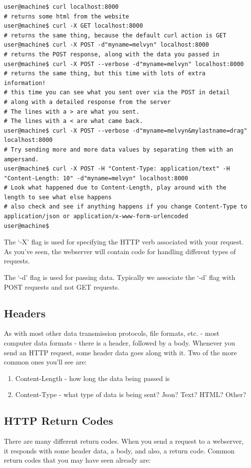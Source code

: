 \documentclass[10pt]{article}
\begin{document}
\begin{lstlisting}
user@machine$ curl localhost:8000
# returns some html from the website
user@machine$ curl -X GET localhost:8000
# returns the same thing, because the default curl action is GET
user@machine$ curl -X POST -d"myname=melvyn" localhost:8000
# returns the POST response, along with the data you passed in
user@machine$ curl -X POST --verbose -d"myname=melvyn" localhost:8000
# returns the same thing, but this time with lots of extra information!
# this time you can see what you sent over via the POST in detail
# along with a detailed response from the server
# The lines with a > are what you sent.
# The lines with a < are what came back.
user@machine$ curl -X POST --verbose -d"myname=melvyn&mylastname=drag" localhost:8000
# Try sending more and more data values by separating them with an ampersand.
user@machine$ curl -X POST -H "Content-Type: application/text" -H "Content-Length: 10" -d"myname=melvyn" localhost:8000
# Look what happened due to Content-Length, play around with the length to see what else happens
# also check and see if anything happens if you change Content-Type to application/json or application/x-www-form-urlencoded
user@machine$
\end{lstlisting}

The `-X' flag is used for specifying the HTTP verb associated with your request. As you've seen, the webserver will contain code for handling different types of requests.

The `-d' flag is used for passing data. Typically we associate the `-d' flag with POST requests and not GET requests.

\subsection{Headers}
As with most other data transmission protocols, file formats, etc. - most computer data formats - there is a header, followed by a body. Whenever you send an HTTP request, some header data goes along with it. Two of the more common ones you'll see are:

\begin{enumerate}
\item Content-Length - how long the data being passed is
\item Content-Type - what type of data is being sent? Json? Text? HTML? Other?
\end{enumerate} 


\subsection{HTTP Return Codes}
There are many different return codes. When you send a request to a webserver, it responds with some header data, a body, and also, a return code. Common return codes that you may have seen already are:
\end{document}
